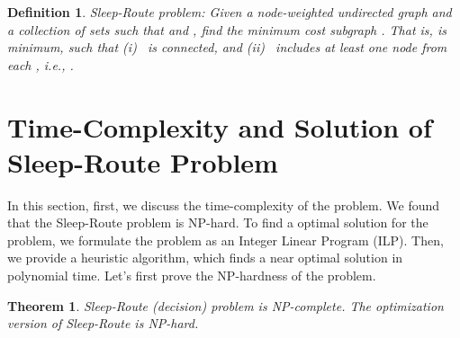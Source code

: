 \documentclass[conference]{IEEEtran}
\newtheorem{theorem}{Theorem}
\newtheorem{definition}[theo]{Definition}
\begin{document}
\begin{definition} Sleep-Route problem: Given a node-weighted undirected graph  and a collection of  sets  such that  and , find the minimum cost subgraph . That is,  is minimum, such that (i)~ is connected, and (ii)~ includes at least one node from each , i.e., .
\end{definition}

\section{Time-Complexity and Solution of Sleep-Route Problem}
\label{sec:sr}
In this section, first, we discuss the time-complexity of the problem. We found that the Sleep-Route problem is NP-hard. To find a optimal solution for the problem, we formulate the problem as an Integer Linear Program (ILP). Then, we provide a heuristic algorithm, which finds a near optimal solution in polynomial time. Let's first prove the NP-hardness of the problem.

\begin{theorem}\label{Thm1}
Sleep-Route (decision) problem is NP-complete. The optimization version of Sleep-Route is NP-hard. 
\end{theorem}
\end{document}

